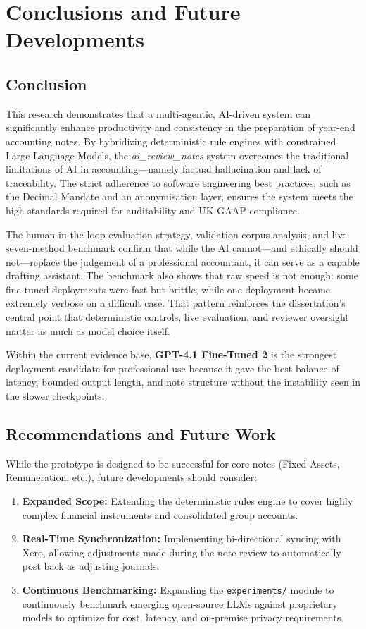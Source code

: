 \chapter{Conclusions and Future Developments}
\label{chap:conclusions}

\section{Conclusion}
This research demonstrates that a multi-agentic, AI-driven system can significantly enhance productivity and consistency in the preparation of year-end accounting notes. By hybridizing deterministic rule engines with constrained Large Language Models, the \textit{ai\_review\_notes} system overcomes the traditional limitations of AI in accounting—namely factual hallucination and lack of traceability. The strict adherence to software engineering best practices, such as the Decimal Mandate and an anonymisation layer, ensures the system meets the high standards required for auditability and UK GAAP compliance.

The human-in-the-loop evaluation strategy, validation corpus analysis, and live seven-method benchmark confirm that while the AI cannot—and ethically should not—replace the judgement of a professional accountant, it can serve as a capable drafting assistant. The benchmark also shows that raw speed is not enough: some fine-tuned deployments were fast but brittle, while one deployment became extremely verbose on a difficult case. That pattern reinforces the dissertation's central point that deterministic controls, live evaluation, and reviewer oversight matter as much as model choice itself.

Within the current evidence base, \textbf{GPT-4.1 Fine-Tuned 2} is the strongest deployment candidate for professional use because it gave the best balance of latency, bounded output length, and note structure without the instability seen in the slower checkpoints.

\section{Recommendations and Future Work}
While the prototype is designed to be successful for core notes (Fixed Assets, Remuneration, etc.), future developments should consider:
\begin{enumerate}
    \item \textbf{Expanded Scope:} Extending the deterministic rules engine to cover highly complex financial instruments and consolidated group accounts.
    \item \textbf{Real-Time Synchronization:} Implementing bi-directional syncing with Xero, allowing adjustments made during the note review to automatically post back as adjusting journals.
    \item \textbf{Continuous Benchmarking:} Expanding the \texttt{experiments/} module to continuously benchmark emerging open-source LLMs against proprietary models to optimize for cost, latency, and on-premise privacy requirements.
\end{enumerate}
